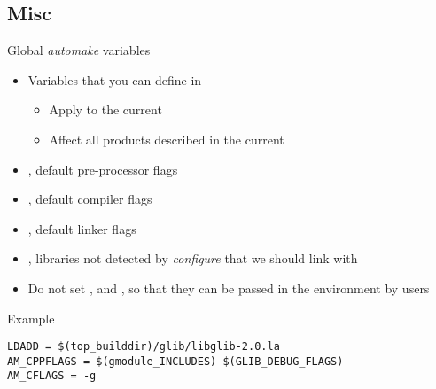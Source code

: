 \subsection{Misc}

\begin{frame}[fragile]{Global {\em automake} variables}

  \begin{itemize}
  \item Variables that you can define in 
    \begin{itemize}
    \item Apply to the current 
    \item Affect all products described in the current 
    \end{itemize}
  \item {}, default pre-processor flags
  \item {}, default compiler flags
  \item {}, default linker flags
  \item {}, libraries not detected by {\em configure} that we
    should link with
  \item Do not set ,  and , so
    that they can be passed in the environment by users
  \end{itemize}

\begin{block}{Example}
\begin{verbatim}
LDADD = $(top_builddir)/glib/libglib-2.0.la
AM_CPPFLAGS = $(gmodule_INCLUDES) $(GLIB_DEBUG_FLAGS)
AM_CFLAGS = -g
\end{verbatim}
\end{block}

\end{frame}

